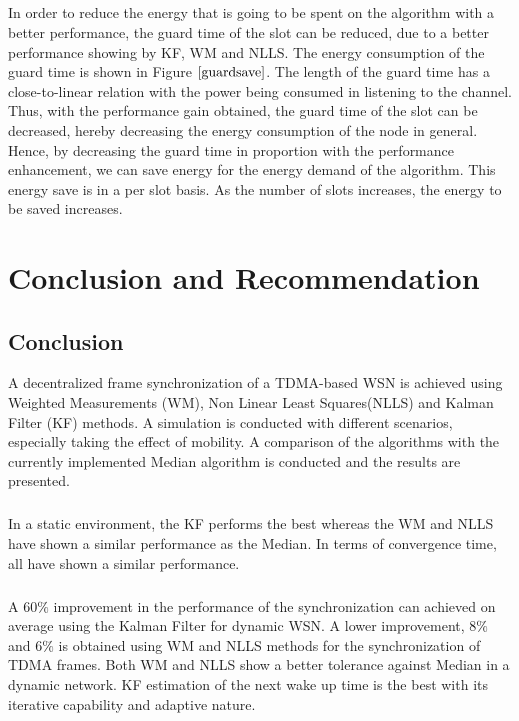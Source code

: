 \documentclass[a4paper,10pt]{report}
\begin{document}
\paragraph*{}
In order to reduce the energy that is going to be spent on the algorithm with a better performance, the guard time of the slot can be reduced, due to a better performance showing by KF, WM and NLLS. The energy consumption of the guard time is shown in Figure
$\ref{guardsave}$. The length of the guard time has a close-to-linear relation with the power being consumed in listening to the channel.
Thus, with the performance gain obtained, the guard time of the slot can be decreased, hereby decreasing the energy consumption of the node in general. Hence, by decreasing the guard time in proportion with the performance enhancement, we can save energy for the energy demand of the algorithm. This energy save is in a per slot basis. As the number of slots increases, the energy to be saved increases.
\chapter{\textbf{Conclusion and Recommendation}}
\section{\textbf{Conclusion}}
A decentralized frame synchronization of a TDMA-based WSN is achieved using Weighted Measurements (WM), Non Linear Least Squares(NLLS) and Kalman Filter (KF) methods. A simulation is conducted with different scenarios, especially taking the effect of mobility. A comparison of the algorithms with the currently implemented Median algorithm is conducted and the results are presented.
\paragraph*{}
In a static environment, the KF performs the best whereas the WM and NLLS have shown a similar performance as the Median. In terms of convergence time, all have shown a similar performance.
\paragraph*{}
A $60\%$ improvement in the performance of the synchronization can achieved on average using the Kalman Filter for dynamic WSN. A lower improvement, $8\%$ and $6\%$ is obtained using WM and NLLS methods for the synchronization of TDMA frames. Both WM and NLLS show a better tolerance against Median in a dynamic network. KF estimation of the next wake up time is the best with its iterative capability and adaptive nature.
\end{document}
